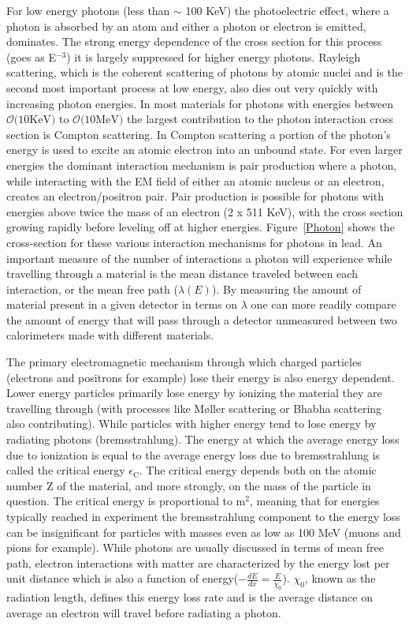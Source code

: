 For low energy photons (less than $\sim$ 100 KeV) the photoelectric effect, where a photon is absorbed by an atom and either a photon or electron is emitted, dominates.  
The strong energy dependence of the cross section for this process (goes as E$^{-3}$) it is largely suppressed for higher energy photons.   
Rayleigh scattering, which is the coherent scattering of photons by atomic nuclei and is the second most important process at low energy, also dies out very quickly with increasing photon energies.  
In most materials for photons with energies between $\mathcal{O}\mathrm(10 \mathrm{KeV})$ to $\mathcal{O}\mathrm(10 \mathrm{MeV})$ the largest contribution to the photon interaction cross section is Compton scattering.  
In Compton scattering a portion of the photon's energy is used to excite an atomic electron into an unbound state.  
For even larger energies the dominant interaction mechanism is pair production where a photon, while interacting with the EM field of either an atomic nucleus or an electron, creates an electron/positron pair.  
Pair production is possible for photons with energies above twice the mass of an electron (2 x 511 KeV), with the cross section growing rapidly before leveling off at higher energies.  
Figure~\ref{Photon} shows the cross-section for these various interaction mechanisms for photons in lead.  
An important measure of the number of interactions a photon will experience while travelling through a material is the mean distance traveled between each interaction, or the mean free path ($\lambda\left(E\right)$).  
By measuring the amount of material present in a given detector in terms on $\lambda$ one can more readily compare the amount of energy that will pass through a detector unmeasured between two calorimeters made with different materials.  


The primary electromagnetic mechanism through which charged particles (electrons and positrons for example) lose their energy is also energy dependent.  
Lower energy particles primarily lose energy by ionizing the material they are travelling through (with processes like M{\o}ller scattering or Bhabha scattering also contributing).  
While particles with higher energy tend to lose energy by radiating photons (bremsstrahlung).  
The energy at which the average energy loss due to ionization is equal to the average energy loss due to bremsstrahlung is called the critical energy $\epsilon_{\mathrm{C}}$.  
The critical energy depends both on the atomic number Z of the material, and more strongly, on the mass of the particle in question.  
The critical energy is proportional to m$^2$, meaning that for energies typically reached in experiment the bremsstrahlung component to the energy loss can be insignificant for particles with masses even as low as 100 MeV (muons and pions for example).  
While photons are usually discussed in terms of mean free path, electron interactions with matter are characterized by the energy lost per unit distance which is also a function of energy($-\frac{dE}{dx}=\frac{E}{\chi_{0}}$).  
$\chi_{0}$, known as the radiation length, defines this energy loss rate and is the average distance on average an electron will travel before radiating a photon.  

